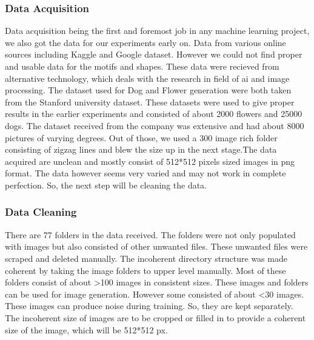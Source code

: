\documentclass{article}
\begin{document}
     \subsubsection{Data Acquisition}
    Data acquisition being the first and foremost job in any machine learning project, we also got the data for our experiments early on. Data from various online sources including Kaggle and Google dataset. However we could not find proper and usable data for the motifs and shapes. These data were recieved from alternative technology, which deals with the research in field of ai and image processing.
    The dataset used for Dog and Flower generation were both taken from the Stanford university dataset. These datasets were used to give proper results in the earlier experiments and consisted of about 2000 flowers and 25000 dogs.
    The dataset received from the company was extensive and had about 8000 pictures of varying degrees. Out of those, we used a 300 image rich folder consisting of zigzag lines and blew the size up in the next stage.The data acquired are unclean and mostly consist of 512*512 pixels sized images in png format. The data however seems very varied and may not work in complete perfection. So, the next step will be cleaning the data.
    
    \subsubsection{Data Cleaning}
    There are 77 folders in the data received. The folders were not only populated with images but also consisted of other unwanted files. These unwanted files were scraped and deleted manually. The incoherent directory structure was made coherent by taking the image folders to upper level manually. Most of these folders consist of about >100 images in consistent sizes. These images and folders can be used for image generation. However some consisted of about <30 images. These images can produce noise during training. So, they are kept separately. The incoherent size of images are to be cropped or filled in to provide a coherent size of the image, which will be 512*512 px.
    
\end{document}
